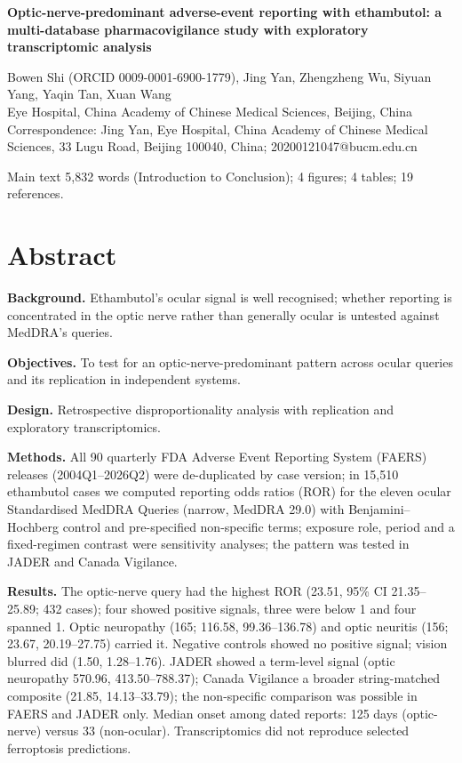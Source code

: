 \documentclass[12pt,a4paper]{article}
\begin{document}
\begin{center}
{\large\bfseries Optic-nerve-predominant adverse-event reporting with ethambutol: a multi-database pharmacovigilance study with exploratory transcriptomic analysis}
\end{center}
\vspace{0.4em}
\begin{center}
Bowen Shi (ORCID 0009-0001-6900-1779), Jing Yan, Zhengzheng Wu, Siyuan Yang, Yaqin Tan, Xuan Wang\\[0.3em]
\small Eye Hospital, China Academy of Chinese Medical Sciences, Beijing, China\\[0.2em]
\small Correspondence: Jing Yan, Eye Hospital, China Academy of Chinese Medical Sciences, 33 Lugu Road, Beijing 100040, China; 20200121047@bucm.edu.cn
\end{center}
\vspace{0.4em}
\begin{center}
\small Main text 5,832 words (Introduction to Conclusion); 4 figures; 4 tables; 19 references.
\end{center}
\vspace{0.8em}
\linenumbers
\section*{Abstract}

\textbf{Background.} Ethambutol's ocular signal is well recognised; whether reporting is concentrated in the optic nerve rather than generally ocular is untested against MedDRA's queries.

\textbf{Objectives.} To test for an optic-nerve-predominant pattern across ocular queries and its replication in independent systems.

\textbf{Design.} Retrospective disproportionality analysis with replication and exploratory transcriptomics.

\textbf{Methods.} All 90 quarterly FDA Adverse Event Reporting System (FAERS) releases (2004Q1–2026Q2) were de-duplicated by case version; in 15,510 ethambutol cases we computed reporting odds ratios (ROR) for the eleven ocular Standardised MedDRA Queries (narrow, MedDRA 29.0) with Benjamini–Hochberg control and pre-specified non-specific terms; exposure role, period and a fixed-regimen contrast were sensitivity analyses; the pattern was tested in JADER and Canada Vigilance.

\textbf{Results.} The optic-nerve query had the highest ROR (23.51, 95\% CI 21.35–25.89; 432 cases); four showed positive signals, three were below 1 and four spanned 1. Optic neuropathy (165; 116.58, 99.36–136.78) and optic neuritis (156; 23.67, 20.19–27.75) carried it. Negative controls showed no positive signal; vision blurred did (1.50, 1.28–1.76). JADER showed a term-level signal (optic neuropathy 570.96, 413.50–788.37); Canada Vigilance a broader string-matched composite (21.85, 14.13–33.79); the non-specific comparison was possible in FAERS and JADER only. Median onset among dated reports: 125 days (optic-nerve) versus 33 (non-ocular). Transcriptomics did not reproduce selected ferroptosis predictions.
\end{document}
